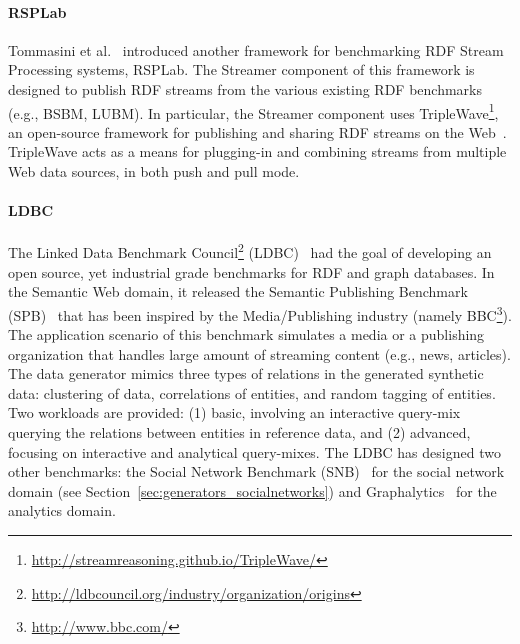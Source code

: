 \paragraph{RSPLab} Tommasini et al.~\cite{tommasini2017rsplab} introduced
another framework for benchmarking RDF Stream Processing systems, RSPLab. The
Streamer component of this framework is designed to publish RDF streams from the
various existing RDF benchmarks (e.g., BSBM, LUBM).
In particular, the Streamer  component uses TripleWave\footnote{\url{http://streamreasoning.github.io/TripleWave/}}, an
open-source framework for publishing and sharing RDF streams on the
Web~\cite{mauri2016triplewave}.   TripleWave acts as a means for plugging-in
and combining streams from multiple Web data sources, in both push and pull mode.



\paragraph{LDBC}  The Linked Data Benchmark Council\footnote{\url{http://ldbcouncil.org/industry/organization/origins}} (LDBC)~\cite{Angles:2014:LDB:2627692.2627697} %
had the goal of developing an open source, yet industrial grade benchmarks for RDF and graph databases. \iffalse The following three benchmarks were developed and are currently maintained.\fi In the Semantic Web domain, it released the Semantic Publishing Benchmark (SPB)~\cite{spb} that has been inspired by the Media/Publishing industry (namely BBC\footnote{\url{http://www.bbc.com/}}). The application scenario of this benchmark simulates a media or a publishing organization that handles large amount of streaming content (e.g., news, articles). \iffalse This content is enriched with metadata that describes it and links it to reference knowledge -- taxonomies and databases that include relevant concepts, entities and factual information. The SPB data generator produces scalable in size synthetic large data. Synthetic data consists of a large number of annotations of media assets that refer entities found in reference datasets.\fi The data generator mimics three types of relations in the generated synthetic data: clustering of data, correlations of entities, and random tagging of entities. Two workloads are provided: (1) basic, involving an interactive query-mix querying the relations between entities in reference data, and (2) advanced,  focusing on interactive and analytical query-mixes. The LDBC has designed two other benchmarks: the Social Network Benchmark (SNB)~\cite{Erling:2015:LSN:2723372.2742786} for the social network domain  (see Section~\ref{sec:generators_socialnetworks}) and Graphalytics~\cite{Iosup:2016:LGB:3007263.3007270}   for the analytics domain.%



